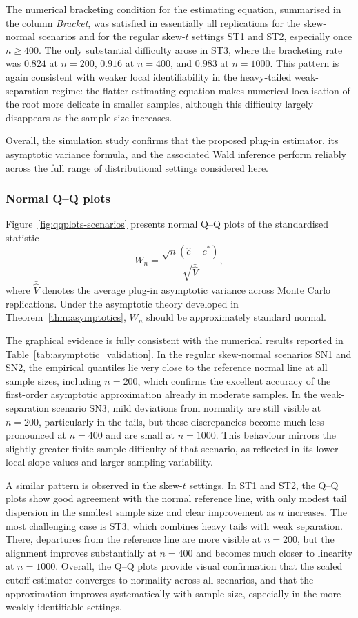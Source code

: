 \documentclass[11pt,a4paper]{article}
\theoremstyle{definition}
\theoremstyle{remark}
\newcommand{\1}{\mathbf{1}}
\begin{document}
The numerical bracketing condition for the estimating equation,
summarised in the column \textit{Bracket}, was satisfied in essentially
all replications for the skew-normal scenarios and for the regular
skew-$t$ settings ST1 and ST2, especially once $n\geq 400$. The only
substantial difficulty arose in ST3, where the bracketing rate was
$0.824$ at $n=200$, $0.916$ at $n=400$, and $0.983$ at $n=1000$. This pattern is again consistent with weaker local identifiability in the
heavy-tailed weak-separation regime: the flatter estimating equation
makes numerical localisation of the root more delicate in smaller
samples, although this difficulty largely disappears as the sample size
increases.

Overall, the simulation study confirms that the proposed plug-in
estimator, its asymptotic variance formula, and the associated Wald
inference perform reliably across the full range of distributional
settings considered here.

\subsubsection{Normal Q--Q plots}

Figure~\ref{fig:qqplots-scenarios} presents normal Q--Q plots of the
standardised statistic
\[
W_n
=
\frac{\sqrt{n}(\hat c-c^*)}{\sqrt{\bar{\hat V}}},
\]
where $\bar{\hat V}$ denotes the average plug-in asymptotic variance
across Monte Carlo replications. Under the asymptotic theory developed
in Theorem~\ref{thm:asymptotics}, $W_n$ should be approximately
standard normal.

The graphical evidence is fully consistent with the numerical results
reported in Table~\ref{tab:asymptotic_validation}. In the regular
skew-normal scenarios SN1 and SN2, the empirical quantiles lie very
close to the reference normal line at all sample sizes, including
$n=200$, which confirms the excellent accuracy of the first-order
asymptotic approximation already in moderate samples. In the
weak-separation scenario SN3, mild deviations from normality are still
visible at $n=200$, particularly in the tails, but these discrepancies
become much less pronounced at $n=400$ and are small at $n=1000$.
This behaviour mirrors the slightly greater finite-sample difficulty of
that scenario, as reflected in its lower local slope values and larger
sampling variability.

A similar pattern is observed in the skew-$t$ settings. In ST1 and ST2, the Q--Q plots show good agreement with the normal reference line,
with only modest tail dispersion in the smallest sample size and clear
improvement as $n$ increases. The most challenging case is ST3, which
combines heavy tails with weak separation. There, departures from the
reference line are more visible at $n=200$, but the alignment improves
substantially at $n=400$ and becomes much closer to linearity at
$n=1000$. Overall, the Q--Q plots provide visual confirmation that the
scaled cutoff estimator converges to normality across all scenarios,
and that the approximation improves systematically with sample size,
especially in the more weakly identifiable settings.
\end{document}
